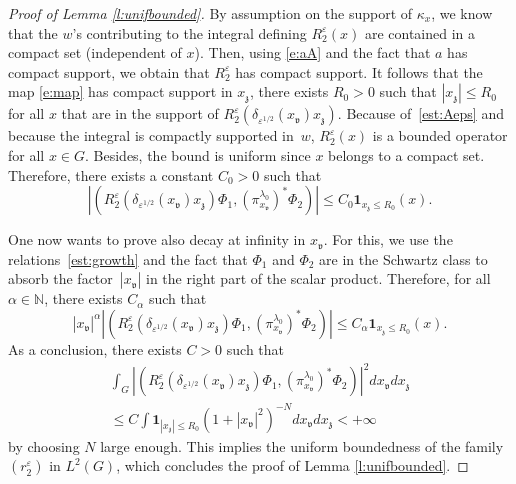 \documentclass[10pt]{amsart}
\newcommand{\bun}{\mathbf{1}}
\theoremstyle{plain}
\theoremstyle{definition}
\let\eps\varepsilon
\def\N{{\mathbb N}}
\begin{document}
\begin{proof}[Proof of Lemma \ref{l:unifbounded}]
By assumption on the support of $\kappa_x$, we know that the $w$'s contributing to the integral defining $R_2^\eps(x)$ are contained in a compact set (independent of $x$). Then, using \eqref{e:aA} and the fact that $a$ has compact support, we obtain that $R_2^\eps$ has compact support. It follows that the map \eqref{e:map} has compact support in $x_{\mathfrak z}$, \ie there exists $R_0>0$ such that $|x_{\mathfrak z}|\leq R_0$ for all $x$ that are in the support of $R_2^\eps(\delta_{\eps^{1/2}} (x_{\mathfrak v})x_{\mathfrak z})$. Because of~\eqref{est:Aeps} and because the integral is compactly supported in~$w$, $R_2^\eps(x)$
is a bounded operator for all $x\in G$. Besides, the bound is uniform since $x$ belongs to a compact set.
Therefore, there exists a constant $C_0>0$ such that
\[
\left| \left(R_2^\eps(\delta_{\eps^{1/2}} (x_{\mathfrak v})x_{\mathfrak z}) \Phi_1,
(\pi^{\lambda_0}_{x_{\mathfrak v}})^*\Phi_2\right)\right|\leq C_0 \bun_{x_{\mathfrak z} \leq R_0} (x).
\]

One now wants to prove also decay at infinity in $x_{\mathfrak v}$. For this, we
use the relations~\eqref{est:growth} and the fact that $\Phi_1$ and $\Phi_2$ are in the Schwartz class to absorb the factor~$|x_{\mathfrak v}|$ in the right part of the scalar product. Therefore, for all $\alpha\in \N$, there exists $C_\alpha$ such that
\[
|x_{\mathfrak v}|^\alpha \left| \left(R_2^\eps(\delta_{\eps^{1/2}} (x_{\mathfrak v})x_{\mathfrak z}) \Phi_1,
(\pi^{\lambda_0}_{x_{\mathfrak v}})^*\Phi_2\right)\right|\leq C_\alpha \bun_{x_{\mathfrak z} \leq R_0} (x).
\]
As a conclusion, there exists $C>0$ such that
\begin{multline*}
\int_G\left|\left(R_2^\eps(\delta_{\eps^{1/2}} (x_{\mathfrak v})x_{\mathfrak z}) \Phi_1,
(\pi^{\lambda_0}_{x_{\mathfrak v}})^*\Phi_2\right)\right|^2 dx_{\mathfrak v} dx_{\mathfrak z}\\[-5pt]
\leq C \int \bun_{|x_{\mathfrak z} |\leq R_0} (1+|x_{\mathfrak v}|^2)^{-N} dx_{\mathfrak v} dx_{\mathfrak z}<+\infty
\end{multline*}
by choosing $N$ large enough. This implies the uniform boundedness of the family $(r_2^\eps)$ in $L^2(G)$, which concludes the proof of Lemma \ref{l:unifbounded}.
\end{proof}
\end{document}
